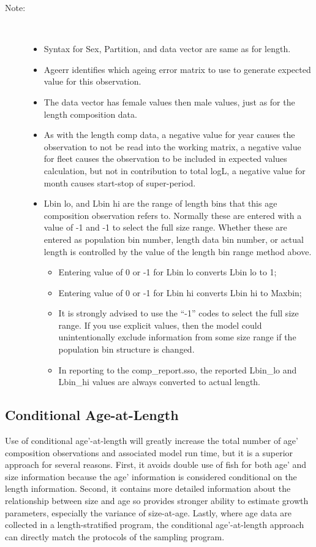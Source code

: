 \begin{description}
	\item[Note:]\
	\begin{itemize}		
		\item Syntax for Sex, Partition, and data vector are same as for length.
		\item Ageerr identifies which ageing error matrix to use to generate expected value for this observation.
		\item The data vector has female values then male values, just as for the length composition data.
		\item As with the length comp data, a negative value for year causes the observation to not be read into the working matrix, a negative value for fleet causes the observation to be included in expected values calculation, but not in contribution to total logL, a negative value for month causes start-stop of super-period.
		\item Lbin lo, and Lbin hi are the range of length bins that this age composition observation refers to.  Normally these are entered with a value of -1 and -1 to select the full size range.  Whether these are entered as population bin number, length data bin number, or actual length is controlled by the value of the length bin range method above.
		\begin{itemize}
			\item Entering value of 0 or -1 for Lbin lo converts Lbin lo to 1;
			\item Entering value of 0 or -1 for Lbin hi converts Lbin hi to Maxbin;
			\item It is strongly advised to use the “-1” codes to select the full size range.  If you use explicit values, then the model could unintentionally exclude information from some size range if the population bin structure is changed.
			\item In reporting to the comp\_report.sso, the reported Lbin\_lo and Lbin\_hi values are always converted to actual length.
		\end{itemize}			  
	\end{itemize}
\end{description}

\subsection{Conditional Age-at-Length}
Use of conditional age’-at-length will greatly increase the total number of age’ composition observations and associated model run time, but it is a superior approach for several reasons.  First, it avoids double use of fish for both age’ and size information because the age’ information is considered conditional on the length information.  Second, it contains more detailed information about the relationship between size and age so provides stronger ability to estimate growth parameters, especially the variance of size-at-age.  Lastly, where age data are collected in a length-stratified program, the conditional age’-at-length approach can directly match the protocols of the sampling program.

